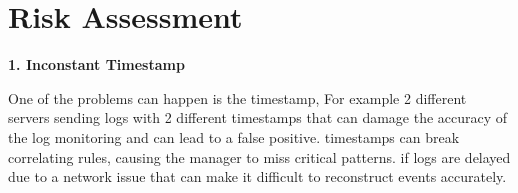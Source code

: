 

\section{Risk Assessment}

    \textbf{1. Inconstant Timestamp}


One of the problems can happen is the timestamp, For example 2 different servers sending logs with 2 different timestamps that can damage the accuracy of the log monitoring and can lead to a false positive. timestamps can break correlating rules, causing the manager to miss critical patterns. if logs are delayed due to a network issue that can make it difficult to reconstruct events accurately.



